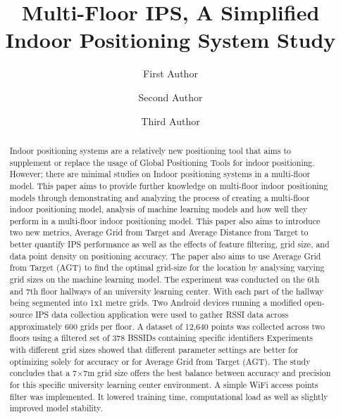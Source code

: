 \documentclass[runningheads]{llncs}
\begin{document}
%
\title{Multi-Floor IPS, A Simplified Indoor Positioning System Study}
%
%
\author{First Author \and
Second Author \and
Third Author}
%
%
%
\maketitle              %
%
\begin{abstract}
Indoor positioning systems are a relatively new positioning tool that aims to supplement or replace the usage of Global Positioning Tools for indoor positioning. However; there are minimal studies on Indoor positioning systems in a multi-floor model. This paper aims to provide further knowledge on multi-floor indoor positioning models through demonstrating and analyzing the process of creating a multi-floor indoor positioning model, analysis of machine learning models and how well they perform in a multi-floor indoor positioning model. This paper also aims to introduce two new metrics, Average Grid from Target and Average Distance from Target to better quantify IPS performance as well as the effects of feature filtering, grid size, and data point density on positioning accuracy. The paper also aims to use Average Grid from Target (AGT) to find the optimal grid-size for the location by analysing varying grid sizes on the machine learning model. The experiment was conducted on the 6th and 7th floor hallways of an university learning center. With each part of the hallway being segmented into 1x1 metre grids. Two Android devices running a modified open-source IPS data collection application were used to gather RSSI data across approximately 600 grids per floor. A dataset of 12,640 points was collected across two floors using a filtered set of 378 BSSIDs containing specific identifiers Experiments with different grid sizes showed that different parameter settings are better for optimizing solely for accuracy or for Average Grid from Target (AGT). The study concludes that a 7×7m grid size offers the best balance between accuracy and precision for this specific university learning center environment. A simple WiFi access points filter was implemented. It lowered training time, computational load as well as slightly improved model stability. 

\end{abstract}
%
%
%
\newpage
\end{document}
